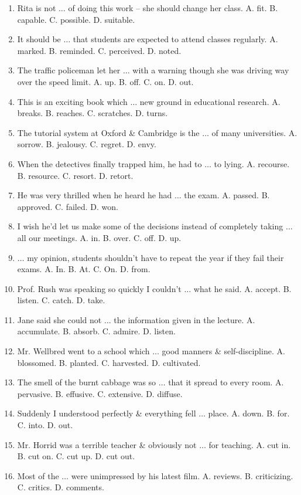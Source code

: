 \documentclass{article}
\numberwithin{equation}{section}
\begin{document}
\begin{enumerate}[leftmargin=2mm]
	\item Rita is not $\ldots$ of doing this work -- she should change her class. A. fit. B. capable. C. possible. D. suitable.
	\item It should be $\ldots$ that students are expected to attend classes regularly. A. marked. B. reminded. C. perceived. D. noted.
	\item The traffic policeman let her $\ldots$ with a warning though she was driving way over the speed limit. A. up. B. off. C. on. D. out.
	\item This is an exciting book which $\ldots$ new ground in educational research. A. breaks. B. reaches. C. scratches. D. turns.
	\item The tutorial system at Oxford \& Cambridge is the $\ldots$ of many universities. A. sorrow. B. jealousy. C. regret. D. envy.
	\item When the detectives finally trapped him, he had to $\ldots$ to lying. A. recourse. B. resource. C. resort. D. retort.
	\item He was very thrilled when he heard he had $\ldots$ the exam. A. passed. B. approved. C. failed. D. won.
	\item I wish he'd let us make some of the decisions instead of completely taking $\ldots$ all our meetings. A. in. B. over. C. off. D. up.
	\item $\ldots$ my opinion, students shouldn't have to repeat the year if they fail their exams. A. In. B. At. C. On. D. from.
	\item Prof. Rush was speaking so quickly I couldn't $\ldots$ what he said. A. accept. B. listen. C. catch. D. take.
	\item Jane said she could not $\ldots$ the information given in the lecture. A. accumulate. B. absorb. C. admire. D. listen.
	\item Mr. Wellbred went to a school which $\ldots$ good manners \& self-discipline. A. blossomed. B. planted. C. harvested. D. cultivated.
	\item The smell of the burnt cabbage was so $\ldots$ that it spread to every room. A. pervasive. B. effusive. C. extensive. D. diffuse.
	\item Suddenly I understood perfectly \& everything fell $\ldots$ place. A. down. B. for. C. into. D. out.
	\item Mr. Horrid was a terrible teacher \& obviously not $\ldots$ for teaching. A. cut in. B. cut on. C. cut up. D. cut out.
	\item Most of the $\ldots$ were unimpressed by his latest film. A. reviews. B. criticizing. C. critics. D. comments.

\end{enumerate}
\end{document}
